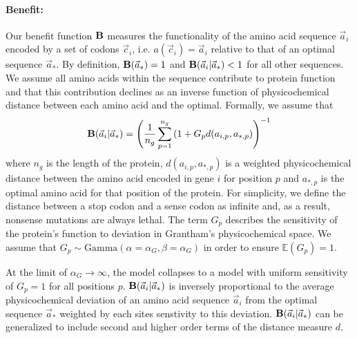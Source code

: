 \documentclass{article}
\newcommand{\EE}{\mathbb{E}} %
\newcommand{\Funcaoptvec}{\ensuremath{\Func(\aoptvec)}\xspace}
\newcommand{\Funcaveci}{\ensuremath{\Func(\aveci|\aoptvec)}\xspace}
\newcommand{\Func}{\ensuremath{\text{\textbf{B}}}\xspace}
\newcommand{\aip}{\ensuremath{a_{i,p}}\xspace}
\newcommand{\alphag}{\ensuremath{\alpha_G}\xspace}
\newcommand{\aoptp}{\ensuremath{a_{*,p}}\xspace}
\newcommand{\aoptvec}{\ensuremath{\Vec{a}_*}\xspace}
\newcommand{\aveci}{\ensuremath{\Vec{a}_i}\xspace}
\newcommand{\cveci}{\ensuremath{\cvec_i}\xspace}
\newcommand{\cvec}{\ensuremath{\Vec{c}}\xspace}
\renewcommand{\ng}{\ensuremath{{n_g}}\xspace}
\newcommand{\gp}{\ensuremath{{G_p}}\xspace}
\begin{document}
\paragraph*{Benefit: }
Our benefit function \Func measures the functionality of the amino acid sequence \aveci encoded by a set of codons \cveci, i.e. $a(\cveci) = \aveci$ relative to that of an optimal sequence $\aoptvec$.
By definition, $\Funcaoptvec = 1$ and $\Funcaveci < 1$ for all other sequences.
We assume all amino acids within the sequence contribute to protein function and that this contribution declines as an inverse function of physicochemical distance between each amino acid and the optimal.
Formally, we assume that
\begin{equation}
\Funcaveci = \left(\frac{1}{\ng} \sum_{p=1}^\ng \left(1 + \gp d(\aip, \aoptp\right)\right)^{-1}
\end{equation}
where $\ng$ is the length of the protein, $d(\aip, \aoptp)$ is a weighted physicochemical distance between the amino acid encoded in gene $i$ for position $p$ and $\aoptp$ is the optimal amino acid for that position of the protein.
For simplicity, we define the distance between a stop codon and a sense codon as infinite and, as a result, nonsense mutations are always lethal.
The term \gp describes the sensitivity of the protein's function to deviation in Grantham's physicochemical space.
We assume that $\gp \sim \text{Gamma}\left(\alpha = \alphag, \beta = \alphag\right)$ in order to ensure $\EE(\gp) = 1$.

At the limit of $\alphag \rightarrow \infty$, the model collapses to a model with uniform sensitivity of $\gp = 1$ for all positions $p$.
\Funcaveci is inversely proportional to the average physicochemical deviation of an amino acid sequence \aveci from the optimal sequence \aoptvec weighted by each sites senstivity to this deviation.
\Funcaveci can be generalized to include second and higher order terms of the distance measure $d$.
\end{document}
